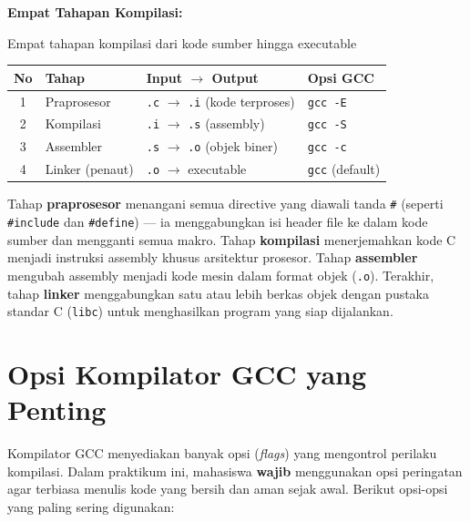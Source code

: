 \documentclass[../main.tex]{subfiles}
\begin{document}
\begin{konsep}
\textbf{Empat Tahapan Kompilasi:}

\begin{modultable}[]{Empat tahapan kompilasi dari kode sumber hingga executable}
\begin{tabular}{|c|l|l|l|}
\hline
\textbf{No} & \textbf{Tahap} & \textbf{Input $\rightarrow$ Output} & \textbf{Opsi GCC} \\
\hline
1 & Praprosesor & \texttt{.c} $\rightarrow$ \texttt{.i} (kode terproses) & \texttt{gcc -E} \\
\hline
2 & Kompilasi & \texttt{.i} $\rightarrow$ \texttt{.s} (assembly) & \texttt{gcc -S} \\
\hline
3 & Assembler & \texttt{.s} $\rightarrow$ \texttt{.o} (objek biner) & \texttt{gcc -c} \\
\hline
4 & Linker (penaut) & \texttt{.o} $\rightarrow$ executable & \texttt{gcc} (default) \\
\hline
\end{tabular}
\end{modultable}
\end{konsep}

Tahap \textbf{praprosesor} menangani semua directive yang diawali tanda \texttt{\#} (seperti \texttt{\#include} dan \texttt{\#define}) --- ia menggabungkan isi header file ke dalam kode sumber dan mengganti semua makro. Tahap \textbf{kompilasi} menerjemahkan kode C menjadi instruksi assembly khusus arsitektur prosesor. Tahap \textbf{assembler} mengubah assembly menjadi kode mesin dalam format objek (\texttt{.o}). Terakhir, tahap \textbf{linker} menggabungkan satu atau lebih berkas objek dengan pustaka standar C (\texttt{libc}) untuk menghasilkan program yang siap dijalankan.

\section{Opsi Kompilator GCC yang Penting}

Kompilator GCC menyediakan banyak opsi (\textit{flags}) yang mengontrol perilaku kompilasi. Dalam praktikum ini, mahasiswa \textbf{wajib} menggunakan opsi peringatan agar terbiasa menulis kode yang bersih dan aman sejak awal. Berikut opsi-opsi yang paling sering digunakan:
\end{document}
